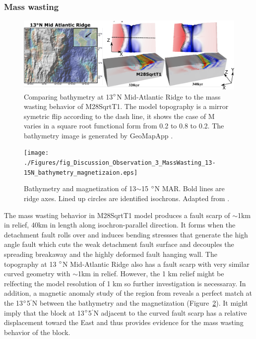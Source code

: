\subsubsection{Mass wasting}

\begin{figure}[h]
 \centering
  \includegraphics[width=1.0\textwidth]{./Figures/fig_Discussion_Observation_1_13N_MAR_CutBack.eps}
 \caption[Comparing bathymetry at 13$\degree$N Mid-Atlantic Ridge to the mass wasting behavior of M28SqrtT1.]{Comparing bathymetry at 13$\degree$N Mid-Atlantic Ridge to the mass wasting behavior of M28SqrtT1. The model topography is a mirror symetric flip according to the dash line, it shows the case of M varies in a square root functional form from 0.2 to 0.8 to 0.2. The bathymetry image is generated by GeoMapApp \citep{Ryan2009}.}
 \label{fig_Discussion_Observation_1_13N_MAR_CutBack}
\end{figure}

\begin{figure}[h]
 \centering
  \texttt{[image: ./Figures/fig\_Discussion\_Observation\_3\_MassWasting\_13-15N\_bathymetry\_magnetizaion.eps]}
 \caption[Bathymetry and magnetization of 13$\sim$15 $\degree$N MAR.]{Bathymetry and magnetization of 13$\sim$15 $\degree$N MAR. Bold lines are ridge axes. Lined up circles are identified isochrons. Adapted from \citep{Smith2008}.}
 \label{fig_Discussion_Observation_3_MassWasting_13-15N_bathymetry_magnetizaion}
\end{figure}

The mass wasting behavior in M28SqrtT1 model produces a fault scarp of $\sim$1km in relief, 40km in length along isochron-parallel direction. It forms when the detachment fault rolls over and induces bending stressses that generate the high angle fault which cuts the weak detachment fault surface and decouples the spreading breakaway and the highly deformed fault hanging wall. The topography at 13 $\degree$N Mid-Atlantic Ridge also has a fault scarp with very similar curved geometry with $\sim$1km in relief. However, the 1 km relief might be relfecting the model resolution of 1 km so further investigation is necessaray. In addition, a magnetic anomaly study of the region from \citep{Smith2008} reveals a perfect match at the 13$\degree$5$^{\prime}$N between the bathymetry and the magnetization (Figure~\hyperref[fig_Discussion_Observation_3_MassWasting_13-15N_bathymetry_magnetizaion]{\ref{fig_Discussion_Observation_3_MassWasting_13-15N_bathymetry_magnetizaion}}). It might imply that the block at 13$\degree$5$^{\prime}$N adjacent to the curved fault scarp has a relative displacement toward the East and thus provides evidence for the mass wasting behavior of the block.   
 
